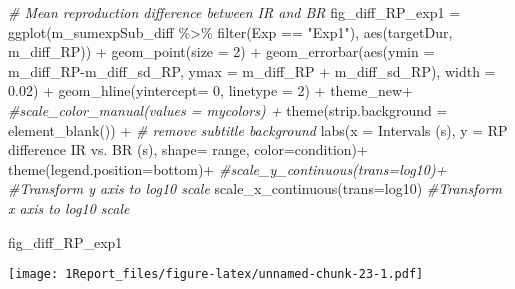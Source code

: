 \documentclass[
]{article}
\newenvironment{Shaded}{\begin{snugshade}}{\end{snugshade}}
\newcommand{\AttributeTok}[1]{\textcolor[rgb]{0.77,0.63,0.00}{#1}}
\newcommand{\CommentTok}[1]{\textcolor[rgb]{0.56,0.35,0.01}{\textit{#1}}}
\newcommand{\DecValTok}[1]{\textcolor[rgb]{0.00,0.00,0.81}{#1}}
\newcommand{\FloatTok}[1]{\textcolor[rgb]{0.00,0.00,0.81}{#1}}
\newcommand{\FunctionTok}[1]{\textcolor[rgb]{0.00,0.00,0.00}{#1}}
\newcommand{\NormalTok}[1]{#1}
\newcommand{\OtherTok}[1]{\textcolor[rgb]{0.56,0.35,0.01}{#1}}
\newcommand{\SpecialCharTok}[1]{\textcolor[rgb]{0.00,0.00,0.00}{#1}}
\newcommand{\StringTok}[1]{\textcolor[rgb]{0.31,0.60,0.02}{#1}}
\begin{document}
\begin{Shaded}
\begin{Highlighting}[]
\CommentTok{\# Mean reproduction difference between IR and BR}
\NormalTok{fig\_diff\_RP\_exp1 }\OtherTok{=} \FunctionTok{ggplot}\NormalTok{(m\_sumexpSub\_diff }\SpecialCharTok{\%\textgreater{}\%} \FunctionTok{filter}\NormalTok{(Exp }\SpecialCharTok{==} \StringTok{"Exp1"}\NormalTok{), }\FunctionTok{aes}\NormalTok{(targetDur, m\_diff\_RP)) }\SpecialCharTok{+} 
  \FunctionTok{geom\_point}\NormalTok{(}\AttributeTok{size =} \DecValTok{2}\NormalTok{) }\SpecialCharTok{+}
  \FunctionTok{geom\_errorbar}\NormalTok{(}\FunctionTok{aes}\NormalTok{(}\AttributeTok{ymin =}\NormalTok{ m\_diff\_RP}\SpecialCharTok{{-}}\NormalTok{m\_diff\_sd\_RP, }\AttributeTok{ymax =}\NormalTok{ m\_diff\_RP }\SpecialCharTok{+}\NormalTok{ m\_diff\_sd\_RP), }\AttributeTok{width =} \FloatTok{0.02}\NormalTok{) }\SpecialCharTok{+} 
  \FunctionTok{geom\_hline}\NormalTok{(}\AttributeTok{yintercept=} \DecValTok{0}\NormalTok{, }\AttributeTok{linetype =} \DecValTok{2}\NormalTok{) }\SpecialCharTok{+}
\NormalTok{  theme\_new}\SpecialCharTok{+} \CommentTok{\#scale\_color\_manual(values = mycolors) +}
  \FunctionTok{theme}\NormalTok{(}\AttributeTok{strip.background =} \FunctionTok{element\_blank}\NormalTok{()) }\SpecialCharTok{+} \CommentTok{\# remove subtitle background}
  \FunctionTok{labs}\NormalTok{(}\AttributeTok{x =} \StringTok{\textquotesingle{}Intervals (s)\textquotesingle{}}\NormalTok{, }\AttributeTok{y =} \StringTok{\textquotesingle{}RP difference IR vs. BR (s)\textquotesingle{}}\NormalTok{, }\AttributeTok{shape=} \StringTok{\textquotesingle{}range\textquotesingle{}}\NormalTok{, }\AttributeTok{color=}\StringTok{\textquotesingle{}condition\textquotesingle{}}\NormalTok{)}\SpecialCharTok{+} 
  \FunctionTok{theme}\NormalTok{(}\AttributeTok{legend.position=}\StringTok{\textquotesingle{}bottom\textquotesingle{}}\NormalTok{)}\SpecialCharTok{+}
  \CommentTok{\#scale\_y\_continuous(trans=\textquotesingle{}log10\textquotesingle{})+ \#Transform y axis to log10 scale}
  \FunctionTok{scale\_x\_continuous}\NormalTok{(}\AttributeTok{trans=}\StringTok{\textquotesingle{}log10\textquotesingle{}}\NormalTok{) }\CommentTok{\#Transform x axis to log10 scale}

\NormalTok{fig\_diff\_RP\_exp1}
\end{Highlighting}
\end{Shaded}

\texttt{[image: 1Report\_files/figure-latex/unnamed-chunk-23-1.pdf]}
\end{document}
